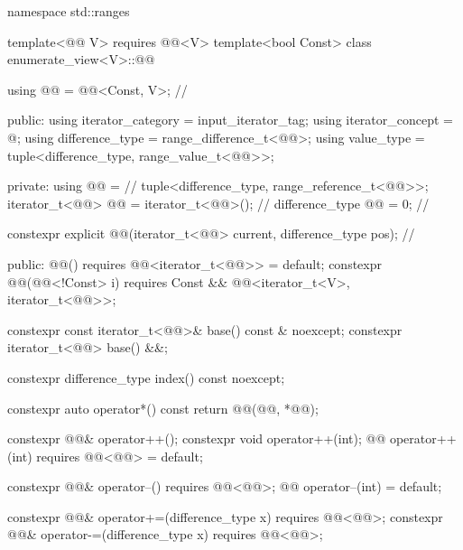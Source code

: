 %
\begin{codeblock}
namespace std::ranges {
  template<@@ V>
    requires @@<V>
  template<bool Const>
  class enumerate_view<V>::@@ {
    using @@ = @@<Const, V>;                         // \expos

  public:
    using iterator_category = input_iterator_tag;
    using iterator_concept = @\seebelow@;
    using difference_type = range_difference_t<@@>;
    using value_type = tuple<difference_type, range_value_t<@@>>;

  private:
    using @@ =                                      // \expos
      tuple<difference_type, range_reference_t<@@>>;
    iterator_t<@@> @@ = iterator_t<@@>();             // \expos
    difference_type @@ = 0;                                   // \expos

    constexpr explicit
      @@(iterator_t<@@> current, difference_type pos);  // \expos

  public:
    @@() requires @@<iterator_t<@@>> = default;
    constexpr @@(@@<!Const> i)
      requires Const && @@<iterator_t<V>, iterator_t<@@>>;

    constexpr const iterator_t<@@>& base() const & noexcept;
    constexpr iterator_t<@@> base() &&;

    constexpr difference_type index() const noexcept;

    constexpr auto operator*() const {
      return @@(@@, *@@);
    }

    constexpr @@& operator++();
    constexpr void operator++(int);
    @@ operator++(int) requires @@<@@> = default;

    constexpr @@& operator--() requires @@<@@>;
    @@ operator--(int) = default;

    constexpr @@& operator+=(difference_type x)
      requires @@<@@>;
    constexpr @@& operator-=(difference_type x)
      requires @@<@@>;

}}
\end{codeblock}
